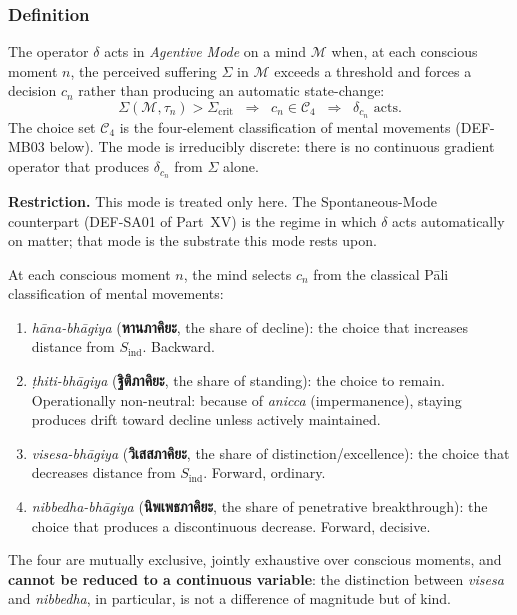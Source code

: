 \documentclass[12pt, a4paper]{article}
\begin{document}
\subsubsection{Definition}

\begin{formalbox}[title={DEF-MB02: $\delta$ in Agentive Mode}]
The operator $\delta$ acts in \emph{Agentive Mode} on a mind
$\mathcal{M}$ when, at each conscious moment $n$, the perceived
suffering $\Sigma$ in $\mathcal{M}$ exceeds a threshold and forces a
decision $c_n$ rather than producing an automatic state-change:
\[
  \Sigma(\mathcal{M}, \tau_n) > \Sigma_{\mathrm{crit}}
  \;\;\Longrightarrow\;\;
  c_n \in \mathcal{C}_4
  \;\;\Longrightarrow\;\;
  \delta_{c_n} \text{ acts}.
\]
The choice set $\mathcal{C}_4$ is the four-element classification
of mental movements (DEF-MB03 below). The mode is irreducibly
discrete: there is no continuous gradient operator that produces
$\delta_{c_n}$ from $\Sigma$ alone.

\textbf{Restriction.} This mode is treated only here. The
Spontaneous-Mode counterpart (DEF-SA01 of Part~XV) is the regime in
which $\delta$ acts automatically on matter; that mode is the
substrate this mode rests upon.
\end{formalbox}

\begin{formalbox}[title={DEF-MB03: The Four-Way Decision $\mathcal{C}_4$}]
At each conscious moment $n$, the mind selects $c_n$ from the
classical Pāli classification of mental movements:
\begin{enumerate}[leftmargin=*]
\item \emph{hāna-bhāgiya} (\textbf{หานภาคิยะ}, the share of decline):
the choice that increases distance from $S_{\mathrm{ind}}$. Backward.
\item \emph{ṭhiti-bhāgiya} (\textbf{ฐิติภาคิยะ}, the share of standing):
the choice to remain. Operationally non-neutral: because of
\emph{anicca} (impermanence), staying produces drift toward decline
unless actively maintained.
\item \emph{visesa-bhāgiya} (\textbf{วิเสสภาคิยะ}, the share of
distinction/excellence): the choice that decreases distance from
$S_{\mathrm{ind}}$. Forward, ordinary.
\item \emph{nibbedha-bhāgiya} (\textbf{นิพเพธภาคิยะ}, the share of
penetrative breakthrough): the choice that produces a discontinuous
decrease. Forward, decisive.
\end{enumerate}
The four are mutually exclusive, jointly exhaustive over conscious
moments, and \textbf{cannot be reduced to a continuous variable}: the
distinction between \emph{visesa} and \emph{nibbedha}, in particular,
is not a difference of magnitude but of kind.
\end{formalbox}
\end{document}
